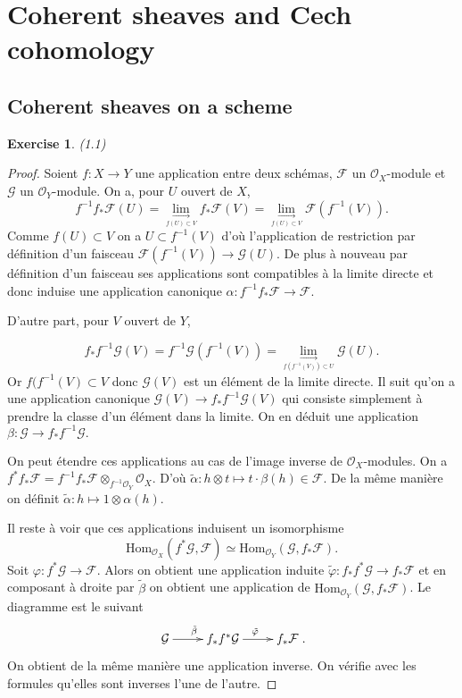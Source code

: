 \documentclass[A4, 11pt]{article}
\newtheorem{exer}{Exercise}
\begin{document}
\section{Coherent sheaves and Cech cohomology}
\subsection{Coherent sheaves on a scheme}
\begin{exer}(1.1)
\end{exer}
\begin{proof}
Soient $f\colon X\rightarrow Y$ une application entre deux schémas, $\mathcal{F}$ un $\mathcal{O}_X$-module et $\mathcal{G}$ un $\mathcal{O}_Y$-module. On a, pour $U$ ouvert de $X$, 
$$f^{-1}f_* \mathcal{F}(U)=\lim\limits_{\underset{f(U)\subset V}{\rightarrow}} f_*\mathcal{F}(V)=\lim\limits_{\underset{f(U)\subset V}{\rightarrow}} \mathcal{F}(f^{-1}(V)).$$
Comme $f(U)\subset V$ on a $U\subset f^{-1}(V)$ d'où l'application de restriction par définition d'un faisceau $\mathcal{F}(f^{-1}(V))\rightarrow \mathcal{G}(U)$. De plus à nouveau par définition d'un faisceau ses applications sont compatibles à la limite directe et donc induise une application canonique $\alpha\colon f^{-1}f_* \mathcal{F} \rightarrow \mathcal{F}$.


D'autre part, pour $V$ ouvert de $Y$,


$$f_*f^{-1} \mathcal{G}(V)=f^{-1}\mathcal{G}(f^{-1}(V))=\lim\limits_{\underset{f(f^{-1}(V))\subset U}{\rightarrow}}\mathcal{G}(U).$$
Or $f(f^{-1}(V)\subset V$ donc $\mathcal{G}(V)$ est un élément de la limite directe. Il suit qu'on a une application canonique $\mathcal{G}(V)\rightarrow f_*f^{-1} \mathcal{G}(V)$ qui consiste simplement à prendre la classe d'un élément dans la limite. On en déduit une application $\beta\colon \mathcal{G}\rightarrow f_*f^{-1} \mathcal{G}.$

On peut étendre ces applications au cas de l'image inverse de $\mathcal{O}_X$-modules. 
On a $f^*f_* \mathcal{F}=f^{-1}f_*\mathcal{F}\otimes_{f^{-1}\mathcal{O}_Y} \mathcal{O}_X$. D'où $\tilde{\alpha} \colon h\otimes t \mapsto t\cdot\beta(h) \in \mathcal{F}$. De la même manière on définit $\tilde{\alpha} \colon h \mapsto 1\otimes \alpha(h)$. 

Il reste à voir que ces applications induisent un isomorphisme 
$$\mathrm{Hom}_{\mathcal{O}_X}(f^*\mathcal{G}, \mathcal{F})\simeq \mathrm{Hom}_{\mathcal{O}_Y} (\mathcal{G},f_* \mathcal{F}).$$
Soit $\varphi\colon f^* \mathcal{G}\rightarrow \mathcal{F}$. Alors on obtient une application induite $\tilde{\varphi} \colon f_*f^*\mathcal{G}\rightarrow f_*\mathcal{F}$ et en composant à droite par $\tilde{\beta}$ on obtient une application de $\mathrm{Hom}_{\mathcal{O}_Y} (\mathcal{G},f_* \mathcal{F})$. Le diagramme est le suivant
$$\xymatrix{
\mathcal{G} \ar[r]^{\tilde{\beta}} & f_*f^* \mathcal{G} \ar[r]^{\tilde{\varphi}} & f_* \mathcal{F}
}.$$
On obtient de la même manière une application inverse. On vérifie avec les formules qu'elles sont inverses l'une de l'autre.
\end{proof}
\end{document}
